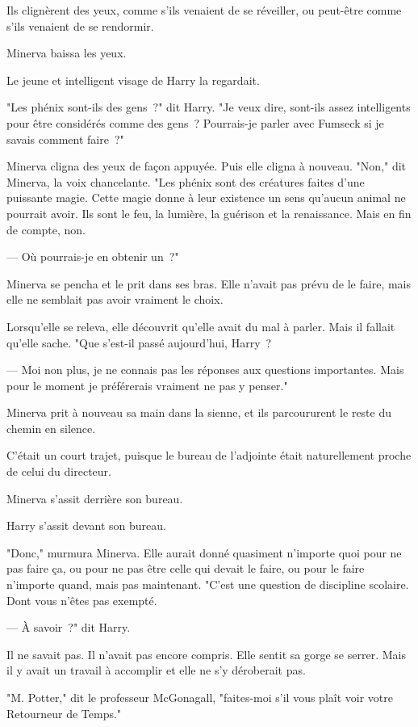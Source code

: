 Ils clignèrent des yeux, comme s'ils venaient de se réveiller, ou peut-être comme s'ils venaient de se rendormir.

Minerva baissa les yeux.

Le jeune et intelligent visage de Harry la regardait.

"Les phénix sont-ils des gens~?" dit Harry. "Je veux dire, sont-ils assez intelligents pour être considérés comme des gens~? Pourrais-je parler avec Fumseck si je savais comment faire~?"

Minerva cligna des yeux de façon appuyée. Puis elle cligna à nouveau. "Non," dit Minerva, la voix chancelante. "Les phénix sont des créatures faites d'une puissante magie. Cette magie donne à leur existence un sens qu'aucun animal ne pourrait avoir. Ils sont le feu, la lumière, la guérison et la renaissance. Mais en fin de compte, non.

--- Où pourrais-je en obtenir un~?"

Minerva se pencha et le prit dans ses bras. Elle n'avait pas prévu de le faire, mais elle ne semblait pas avoir vraiment le choix.

Lorsqu'elle se releva, elle découvrit qu'elle avait du mal à parler. Mais il fallait qu'elle sache. "Que s'est-il passé aujourd'hui, Harry~?

--- Moi non plus, je ne connais pas les réponses aux questions importantes. Mais pour le moment je préférerais vraiment ne pas y penser."

Minerva prit à nouveau sa main dans la sienne, et ils parcoururent le reste du chemin en silence.

C'était un court trajet, puisque le bureau de l'adjointe était naturellement proche de celui du directeur.

Minerva s'assit derrière son bureau.

Harry s'assit devant son bureau.

"Donc," murmura Minerva. Elle aurait donné quasiment n'importe quoi pour ne pas faire ça, ou pour ne pas être celle qui devait le faire, ou pour le faire n'importe quand, mais pas maintenant. "C'est une question de discipline scolaire. Dont vous n'êtes pas exempté.

--- À savoir~?" dit Harry.

Il ne savait pas. Il n'avait pas encore compris. Elle sentit sa gorge se serrer. Mais il y avait un travail à accomplir et elle ne s'y déroberait pas.

"M. Potter," dit le professeur McGonagall, "faites-moi s'il vous plaît voir votre Retourneur de Temps."

